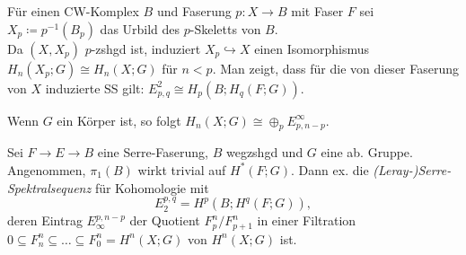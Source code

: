 \documentclass{cheat-sheet}
\begin{document}
\begin{konstr}
  Für einen CW-Komplex $B$ und Faserung $p : X \to B$ mit Faser $F$ sei $X_p \coloneqq p^{-1}(B_p)$ das Urbild des $p$-Skeletts von $B$. \\
  Da $(X, X_p)$ $p$-zshgd ist, induziert $X_p \hookrightarrow X$ einen Isomorphismus $H_n(X_p; G) \cong H_n(X; G)$ für $n < p$.
  Man zeigt, dass für die von dieser Faserung von $X$ induzierte SS gilt: $E^2_{p,q} \cong H_p(B; H_q(F; G))$.
\end{konstr}

\begin{bem}
  Wenn $G$ ein Körper ist, so folgt $H_n(X; G) \cong \oplus_p E^\infty_{p,n-p}$.
\end{bem}

\begin{thm}
  Sei $F \to E \to B$ eine Serre-Faserung, $B$ wegzshgd und $G$ eine ab. Gruppe. Angenommen, $\pi_1(B)$ wirkt trivial auf $H^*(F; G)$.
  Dann ex. die \emph{(Leray-)Serre-Spektralsequenz} für Kohomologie mit
  \[ E_2^{p,q} = H^p(B; H^q(F; G)), \]
  deren Eintrag $E_\infty^{p,n-p}$ der Quotient $F_p^n/F_{p+1}^n$ in einer Filtration
  $0 \subseteq F_n^n \subseteq \ldots \subseteq F_0^n = H^n(X; G)$ von $H^n(X; G)$ ist.
\end{thm}


\end{document}
